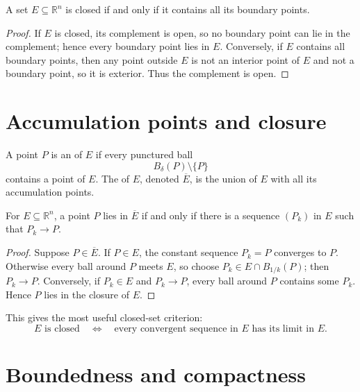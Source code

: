 \begin{proposition}
A set \(E\subseteq\mathbb R^n\) is closed if and only if it contains all its boundary points.
\end{proposition}

\begin{proof}
If \(E\) is closed, its complement is open, so no boundary point can lie in the complement; hence every boundary point lies in \(E\).  Conversely, if \(E\) contains all boundary points, then any point outside \(E\) is not an interior point of \(E\) and not a boundary point, so it is exterior.  Thus the complement is open.
\end{proof}

\section{Accumulation points and closure}

\begin{definition}
A point \(P\) is an  of \(E\) if every punctured ball
\[
  B_\delta(P)\setminus\{P\}
\]
contains a point of \(E\).  The  of \(E\), denoted \(\overline E\), is the union of \(E\) with all its accumulation points.
\end{definition}

\begin{proposition}
For \(E\subseteq\mathbb R^n\), a point \(P\) lies in \(\overline E\) if and only if there is a sequence \((P_k)\) in \(E\) such that \(P_k\to P\).
\end{proposition}

\begin{proof}
Suppose $P\in\overline E$. If $P\in E$, the constant sequence $P_k=P$ converges to $P$. Otherwise every ball around $P$ meets $E$, so choose $P_k\in E\cap B_{1/k}(P)$; then $P_k\to P$. Conversely, if $P_k\in E$ and $P_k\to P$, every ball around $P$ contains some $P_k$. Hence $P$ lies in the closure of $E$.
\end{proof}

This gives the most useful closed-set criterion:
\[
  E\text{ is closed}\quad\Longleftrightarrow\quad
  \text{every convergent sequence in }E\text{ has its limit in }E.
\]

\section{Boundedness and compactness}

